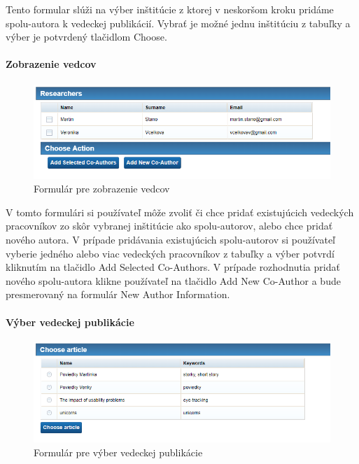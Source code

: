 \documentclass[10pt,oneside,slovak,a4paper]{article}
\begin{document}
Tento formular slúži na výber inštitúcie z ktorej v neskoršom kroku pridáme spolu-autora k vedeckej publikácií. Vybrať je možné jednu inštitúciu z tabuľky a výber je potvrdený tlačidlom Choose.

\paragraph{Zobrazenie vedcov}

\begin{figure} [H]
\centering
\includegraphics[scale=0.4]{forms/Coachfordisplayingresearchers.png} 
\caption{Formulár pre zobrazenie vedcov}
\end{figure}

V tomto formulári si používateľ môže zvoliť či chce pridať existujúcich vedeckých pracovníkov zo skôr vybranej inštitúcie ako spolu-autorov, alebo chce pridať nového autora. V prípade pridávania existujúcich spolu-autorov si používateľ vyberie jedného alebo viac vedeckých pracovníkov z tabuľky a výber potvrdí kliknutím na tlačidlo Add Selected Co-Authors. V prípade rozhodnutia pridať nového spolu-autora klikne používateľ na tlačidlo Add New Co-Author a bude presmerovaný na formulár New Author Information. 

\paragraph{Výber vedeckej publikácie}

\begin{figure} [H]
\centering
\includegraphics[scale=0.4]{forms/CoachChoosearticle.png} 
\caption{Formulár pre výber vedeckej publikácie}
\end{figure}
\end{document}
